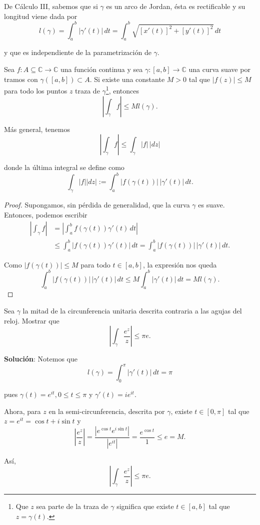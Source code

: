 De Cálculo III, sabemos que si $\gamma$ es un arco de Jordan, ésta es rectificable y su longitud viene dada por 
$$l(\gamma) = \int_a^b |\gamma'(t)| \,dt = \int_a^b \sqrt{[x'(t)]^2 + [y'(t)]^2} \,dt$$

y que es independiente de la parametrización de $\gamma$.

\begin{teorema} \label{CotaIntegral}
Sea $f: A \subseteq \mathbb{C} \longrightarrow \mathbb{C}$ una función  continua y sea $\gamma: [a,b] \longrightarrow \mathbb{C}$ una curva suave por tramos con $\gamma([a,b]) \subset A$. Si existe una constante $M > 0$ tal que $|f(z)| \leq M$ para todo los puntos $z$ traza de $\gamma$\footnote{ Que $z$ sea parte de la traza de $\gamma$ significa que existe $t \in [a,b]$ tal que $z = \gamma(t)$.  }, entonces
$$\left|\int_{\gamma} f \right| \leq M l(\gamma).$$

Más general, tenemos
$$\left|\int_{\gamma} f \right| \leq \int_{\gamma} |f| \,|dz|$$

donde la última integral se define como 
$$\int_{\gamma} |f| |dz| := \int_a^b |f(\gamma(t))|\, |\gamma'(t)| \,dt.$$
\end{teorema}

\begin{proof}

Supongamos, sin pérdida de generalidad, que la curva $\gamma$ es suave. Entonces, podemos escribir
\begin{align*}
\left| \int_{\gamma} f \right| &= \left| \int_a^b f(\gamma(t)) \gamma'(t) \,dt \right| \\
&\leq \int_a^b |f(\gamma(t)) \gamma'(t)| \,dt = \int_a^b |f(\gamma(t))| \, |\gamma'(t)| \,dt.
\end{align*}

Como $|f(\gamma(t))| \leq M$ para todo $t \in [a,b]$, la expresión nos queda
\begin{equation*}
\int_a^b |f(\gamma(t))| \, |\gamma'(t)| \,dt \leq M \int_a^b |\gamma'(t)| \,dt = M l(\gamma).
\end{equation*}

\end{proof}

\begin{ejemplo}
Sea $\gamma$ la mitad de la circunferencia unitaria descrita contraria a las agujas del reloj. Mostrar que 
$$\left| \int_{\gamma} \frac{e^z}{z}\right| \leq \pi e.$$

\textbf{Solución}: Notemos que 
$$l(\gamma) = \int_0^{\pi} |\gamma'(t)| \,dt = \pi$$

pues $\gamma(t) = e^{it}, 0 \leq t \leq \pi$ y $\gamma'(t)= i e^{it}$. 

Ahora, para $z$ en la semi-circunferencia, descrita por $\gamma$, existe $t \in [0,\pi]$ tal que $z = e^{it} = \cos t + i \sin t$ y 
$$\left| \frac{e^z}{z}\right| = \frac{|e^{\cos t} e^{i\sin t}|}{|e^{it}|} = \frac{e^{\cos t}}{1} \leq e = M.$$

Así,
$$\left| \int_{\gamma} \frac{e^z}{z}\right| \leq \pi e.$$
\end{ejemplo}

